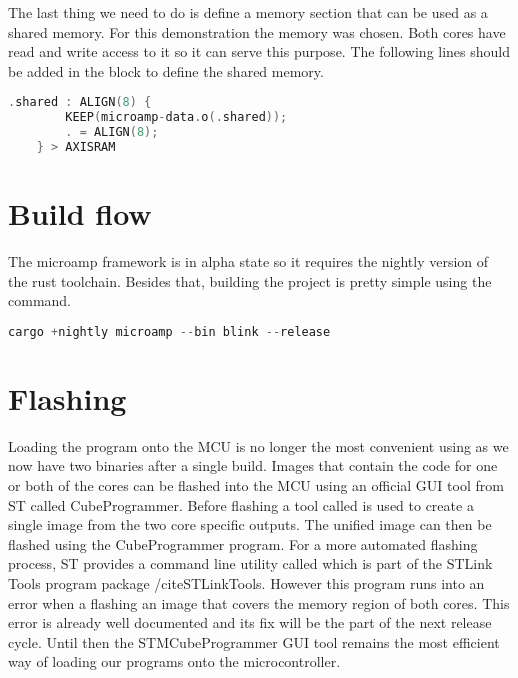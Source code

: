 The last thing we need to do is define a memory section that can be used as a shared memory. For this demonstration the  memory was chosen. Both cores have read and write access to it so it can serve this purpose. The following lines should be added in the  block to define the shared memory.

\begin{lstlisting}[language=C,frame=single,float=!ht,label={lst:link-shared},caption={Defining Shared Memory in Linker File}]
    .shared : ALIGN(8) {
        KEEP(microamp-data.o(.shared));
        . = ALIGN(8);
    } > AXISRAM
\end{lstlisting}

\section{Build flow}

The microamp framework is in alpha state so it requires the nightly version of the rust toolchain. Besides that, building the project is pretty simple using the  command.

\begin{lstlisting}[language=C,frame=single,float=!ht,label={lst:cargo-microamp},caption={Building a Dual Core Application with Microamp}]
    cargo +nightly microamp --bin blink --release
\end{lstlisting}

\section{Flashing}

Loading the program onto the MCU is no longer the most convenient using  as we now have two binaries after a single build. Images that contain the code for one or both of the cores can be flashed into the MCU using an official GUI tool from ST called CubeProgrammer. Before flashing a tool called  is used to create a single image from the two core specific outputs. The unified image can then be flashed using the CubeProgrammer program. For a more automated flashing process, ST provides a command line utility called  which is part of the STLink Tools program package /cite{STLinkTools}. However this program runs into an error when a flashing an image that covers the memory region of both cores. This error \cite{STFlashError} is already well documented and its fix will be the part of the next release cycle. Until then the STMCubeProgrammer GUI tool remains the most efficient way of loading our programs onto the microcontroller.
